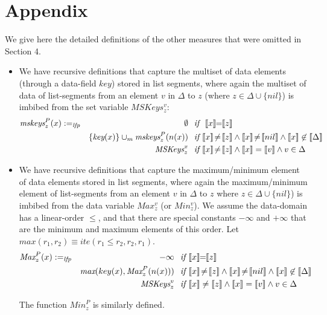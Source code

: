 \newpage
\section*{Appendix}
We give here the detailed definitions of the other  measures that were omitted in Section 4.

\begin{itemize}
\item We have recursive definitions that capture the multiset of data elements (through a data-field
    $\textit{key}$) stored in list segments, 
    where again the multiset of data 
of list-segments from an element $v$ in $\Delta$ to $z$ (where $z \in \Delta \cup \{nil\}$) is imbibed from the set variable $MSKeys_z^v$:
\begin{align*}
\textit{mskeys}_z^P(x) & :=_{\textit{lfp}} & \emptyset & \textit{~~if~} \ \sem{x}\!\!=\!\!\sem{z} \\
& & \{\textit{key}(x)\} \cup_m \textit{mskeys}_z^P(n(x)) & \textit{~~if~} \sem{x} \!\not =\! \sem{z} \wedge \sem{x} \!\not =\! \sem{nil} \wedge \sem{x} \not \in \sem{\Delta} \\
& & \textit{MSKeys}_z^x & \textit{~~if~} \sem{x} \!\not =\! \sem{z} \wedge \sem{x}=\sem{v} \wedge v \in \Delta 
\end{align*}

    \item We have recursive definitions that capture the maximum/minimum element of data elements stored in list segments, where again the maximum/minimum element  
of list-segments from an element $v$ in $\Delta$ to $z$ where $z \in \Delta \cup \{nil\}$) is imbibed from the data variable $Max_z^v$ (or $Min_z^v$).
We assume the data-domain has a linear-order $\leq$, and that there are special constants $-\infty$ and $+\infty$
that are the minimum and maximum elements of this order. Let $max(r_1,r_2) \equiv \textit{ite}(r_1 \leq r_2, r_2, r_1)$.
\begin{align*}
\textit{Max}_z^P(x) & :=_{\textit{lfp}} & -\infty & \textit{~~if~} \sem{x}\!\!=\!\!\sem{z} \\
& & \textit{max}(key(x), \textit{Max}_z^P(n(x))) & \textit{~~if~} \sem{x} \!\not =\! \sem{z} \wedge \sem{x} \!\not=\! \sem{nil} \wedge \sem{x} \not \in \sem{\Delta} \\
& & \textit{MSKeys}_z^v & \textit{~~if~} \sem{x} \not = \sem{z} \wedge \sem{x} = \sem{v} \wedge v \in \Delta 
\end{align*}

 The function $\textit{Min}_z^P$ is similarly defined.
 

\end{itemize}
